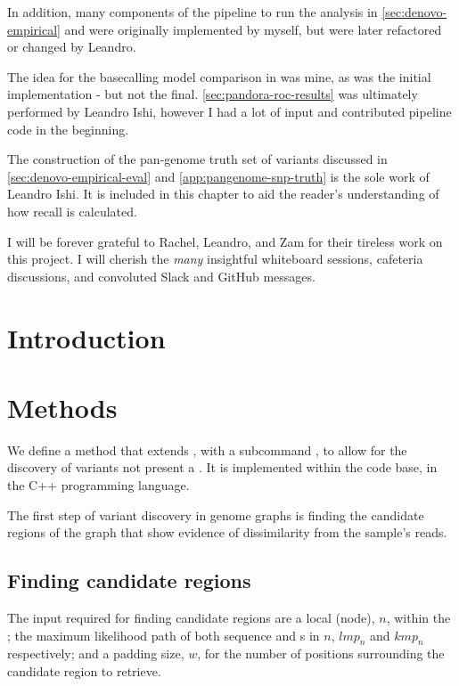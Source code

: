 In addition, many components of the pipeline to run the analysis in \autoref{sec:denovo-empirical} and \cite{pandora} were originally implemented by myself, but were later refactored or changed by Leandro.

The idea for the \ont{} basecalling model comparison in \label{sec:denovo-methylation} was mine, as was the initial implementation - but not the final. \autoref{sec:pandora-roc-results} was ultimately performed by Leandro Ishi, however I had a lot of input and contributed pipeline code in the beginning.

The construction of the pan-genome truth set of variants discussed in \autoref{sec:denovo-empirical-eval} and \autoref{app:pangenome-snp-truth} is the sole work of Leandro Ishi. It is included in this chapter to aid the reader's understanding of how recall is calculated.

I will be forever grateful to Rachel, Leandro, and Zam for their tireless work on this project. I will cherish the \emph{many} insightful whiteboard sessions, cafeteria discussions, and convoluted Slack and GitHub messages.

\section{Introduction}

\section{Methods}
\label{sec:denovo-method}

We define a method that extends \pandora{}, with a subcommand , to allow for the \denovo{} discovery of variants not present a \prg{}. It is implemented within the \pandora{} code base, in the C++ programming language. 

The first step of \denovo{} variant discovery in genome graphs is finding the candidate regions of the graph that show evidence of dissimilarity from the sample's reads.

\subsection{Finding candidate regions}
\label{sec:denovo-candidate-regions}

The input required for finding candidate regions are a local \prg{} (node), $n$, within the \pandora{} \panrg{}; the maximum likelihood path of both sequence and \kmer{}s in $n$, $lmp_n$ and $kmp_n$ respectively; and a padding size, $w$, for the number of positions surrounding the candidate region to retrieve.

